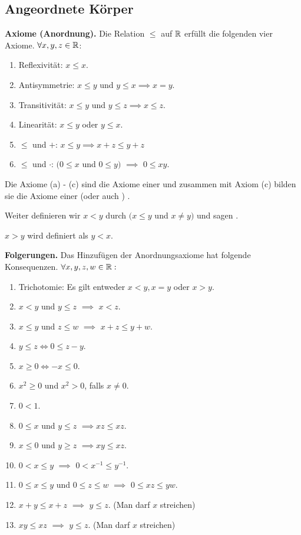 \subsection{Angeordnete Körper}
\textbf{Axiome (Anordnung).} Die Relation $\leq$ auf $\mathbb{R}$ erfüllt die folgenden vier Axiome. $\forall x,y,z \in \mathbb{R}$:
\begin{enumerate}
  \item Reflexivität: $x \leq x$.
  \item Antisymmetrie: $x \leq y$ und $y \leq x \implies x = y$.
  \item Transitivität: $x \leq y$ und $y \leq z \implies x \leq z$.
  \item Linearität: $x \leq y$ oder $y \leq x$.
  \item $\leq$ und $+$: $x \leq y \implies x+z \leq y+z$
  \item $\leq$ und $\cdot$: $(0 \leq x$ und $0 \leq y)$ $\implies$ $0\leq xy$.
\end{enumerate}

Die Axiome (a) - (c) sind die Axiome einer  und zusammen mit Axiom (c) bilden sie die Axiome einer  (oder auch ) .

\begin{mydef-non}
  Weiter definieren wir $x < y$ durch $(x \leq y$ und $x \neq y)$ und sagen .
\end{mydef-non}

\begin{mydef-non}
  $x > y$ wird definiert als $y < x$.
\end{mydef-non}

\textbf{Folgerungen.} Das Hinzufügen der Anordnungsaxiome hat folgende Konsequenzen. $\forall x,y,z,w \in \mathbb{R}:$
\begin{enumerate}
  \item Trichotomie: Es gilt entweder $x < y, x=y$ oder $x > y$.
  \item $x < y$ und $y \leq z$ $\implies$ $x < z$.
  \item $x \leq y$ und $z \leq w$ $\implies$ $x+z \leq y+w$.
  \item $y \leq z \iff 0 \leq z-y$.
  \item $x \geq 0 \iff -x \leq 0$.
  \item $x^2 \geq 0$ und $x^2>0$, falls $x \neq 0$.
  \item $0 < 1$.
  \item $0 \leq x$ und $y \leq z$ $\implies xz \leq xz$.
  \item $x \leq 0$ und $y \geq z$ $\implies xy \leq xz$.
  \item $0 < x \leq y$ $\implies$ $0 < x^{-1} \leq y^{-1}$.
  \item $0 \leq x \leq y$ und $0 \leq z \leq w$ $\implies$ $0 \leq xz \leq yw$.
  \item $x + y \leq x + z$ $\implies$ $y \leq z$. (Man darf $x$ streichen)
  \item $xy \leq xz$ $\implies$ $y \leq z$. (Man darf $x$ streichen)
\end{enumerate}

